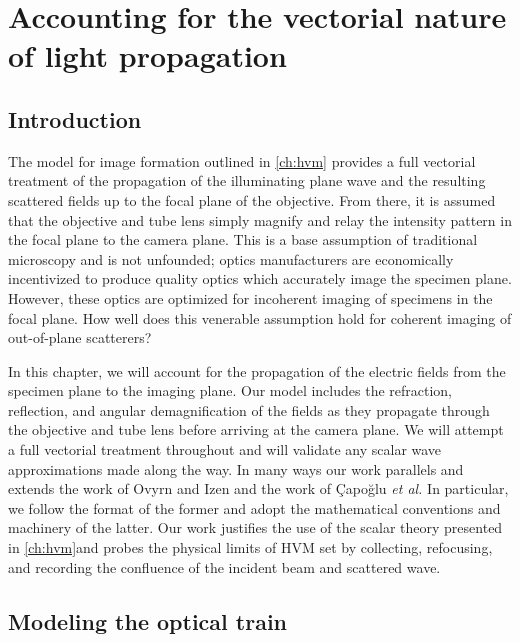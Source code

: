 \chapter{Accounting for the vectorial nature of light propagation}
\label{ch:debye}




\section{Introduction}

The model for image formation outlined in \autoref{ch:hvm} provides a full
vectorial treatment of the propagation of the illuminating plane wave and
the resulting scattered fields up to the focal plane of the objective.
From there, it is assumed that the
objective and tube lens simply magnify and relay the intensity pattern in
the focal plane to the camera plane.
This is a base assumption of traditional microscopy and is not unfounded; optics
manufacturers are economically incentivized to produce quality optics which
accurately image the specimen plane. However, these optics are optimized for
incoherent imaging of specimens in the focal plane.
How well does this venerable assumption hold for coherent imaging of out-of-plane
scatterers?

In this chapter, we will account for the propagation of the electric fields from
the specimen plane to the imaging plane. Our model includes the
refraction, reflection, and angular demagnification of the fields as they propagate
through the objective and tube lens before arriving at the camera plane.
We will attempt a full vectorial treatment throughout and will
validate any scalar wave approximations made along the way. In many ways our work
parallels and extends the work of Ovyrn and Izen\cite{izen00} and the work of
\c{C}apo\u{g}lu\cite{capoglu12} \emph{et al.} In particular, we follow the format of the
former and adopt the mathematical conventions and machinery of the latter.
Our work justifies the use of the scalar theory
presented in \autoref{ch:hvm}and probes the physical limits
of HVM set by collecting, refocusing, and recording the confluence of the incident
beam and scattered wave.


\section{Modeling the optical train}

